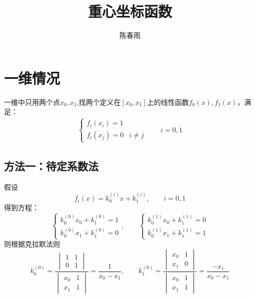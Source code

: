 \documentclass[12pt,a4paper]{article}
\title{重心坐标函数}
\author{陈春雨}
\date{\chntoday}
\begin{document}
\maketitle
\newpage
\section{一维情况}
一维中只用两个点$x_0,x_1$,找两个定义在$[x_0,x_1]$上的线性函数$f_0(x),f_1(x)$，满足：
\begin{align}
\begin{cases}
f_i(x_i)=1&{}\\
f_i(x_j)=0&i\ne j
\end{cases}
\qquad i=0,1
\end{align}
\subsection*{方法一：待定系数法}
假设
$$
f_i(x)=k_0^{(i)}x+k_1^{(i)},\qquad i=0,1
$$
得到方程：
$$
\begin{cases}
k_0^{(0)}x_0+k_1^{(0)}=1\\
k_0^{(0)}x_1+k_1^{(0)}=0
\end{cases},\qquad
\begin{cases}
k_0^{(1)}x_0+k_1^{(1)}=0\\
k_0^{(1)}x_1+k_1^{(1)}=1
\end{cases}
$$
则根据克拉默法则
$$
k_0^{(0)}=\frac{\begin{vmatrix}
                               1&1\\
                               0&1
                              \end{vmatrix}}{\begin{vmatrix}
                                              x_0&1\\
                                              x_1&1
                                             \end{vmatrix}}=\frac{1}{x_0-x_1},\qquad
k_1^{(0)}=\frac{\begin{vmatrix}
                               x_0&1\\
                               x_1&0
                              \end{vmatrix}}{\begin{vmatrix}
                                              x_0&1\\
                                              x_1&1
                                             \end{vmatrix}}=\frac{-x_1}{x_0-x_1}                                             
$$
\end{document}
